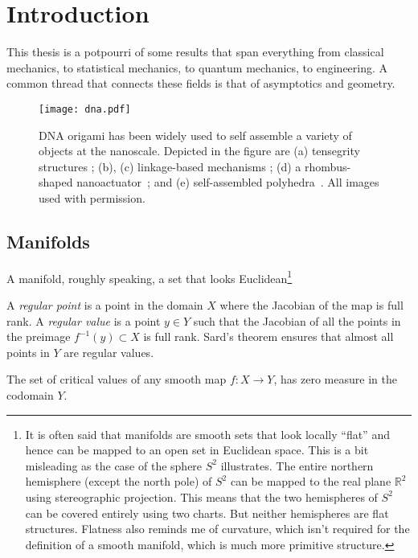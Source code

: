 
\chapter{Introduction}

This thesis is a potpourri of some results that span everything from classical mechanics, to statistical mechanics, to quantum mechanics, to engineering.
A common thread that connects these fields is that of asymptotics and geometry.

\begin{figure}
  \begin{center}
    \texttt{[image: dna.pdf]}
  \end{center}
  \caption{DNA origami has been widely used to self assemble a variety of objects at the nanoscale.
    Depicted in the figure are (a) tensegrity structures \cite{liedl2010}; (b), (c) linkage-based mechanisms \cite{marras2015,zhou2015}; (d) a rhombus-shaped nanoactuator~\cite{ke2016}; and (e) self-assembled polyhedra~\cite{iinuma2014}.  All images used with permission.}
  \label{fig:}
\end{figure}

\section{Manifolds}

A manifold, roughly speaking, a set that looks Euclidean\footnote{It is often said that manifolds are smooth sets that look locally ``flat'' and hence can be mapped to an open set in Euclidean space.
This is a bit misleading as the case of the sphere $S^2$ illustrates.
The entire northern hemisphere (except the north pole) of $S^2$ can be mapped to the real plane $\mathbb{R}^{2}$ using stereographic projection.
This means that the two hemispheres of $S^2$ can be covered entirely using two charts.
But neither hemispheres are flat structures.
Flatness also reminds me of curvature, which isn't required for the definition of a smooth manifold, which is much more primitive structure.}

A \emph{regular point} is a point in the domain $X$ where the Jacobian of the map is full rank.
A \emph{regular value} is a point $y \in Y$ such that the Jacobian of all the points in the preimage $f^{-1}(y) \subset X$ is full rank.
Sard's theorem ensures that almost all points in $Y$ are regular values.
%
\begin{theorem}
  The set of critical values of any smooth map $f: X \to Y$, has zero measure in the codomain $Y$.
\end{theorem}

